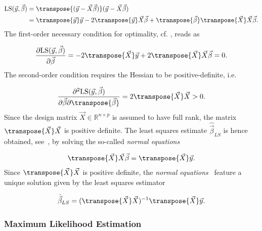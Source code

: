 \begin{align} \label{eq:LS_derivation}
		\begin{split}
				\text{LS}(\vec{y}, \vec{\beta})  &=\transpose{(\vec{y} - \vec{X} \vec{\beta})}(\vec{y} - \vec{X} \vec{\beta}) \\ 
								 				&=\transpose{\vec{y}}\vec{y} - 2\transpose{\vec{y}}\vec{X} \vec{\beta} + \transpose{\vec{\beta}}    \transpose{\vec{X}} \vec{X} \vec{\beta}.
		\end{split}
\end{align}
%
The first-order necessary condition for optimality, cf. \cite{luenberger1984linear}, reads as

\begin{align} \label{eq:LS_1st_derivative}
	\frac{\partial \text{LS}(\vec{y}, \vec{\beta})}{\partial \vec{\beta}} = -2\transpose{\vec{X}} \vec{y} + 2\transpose{\vec{X}} \vec{X} \vec{\beta} = 0.
\end{align}
%
The second-order condition requires the Hessian to be positive-definite, i.e. 

\begin{align} \label{eq:LS_2nd_derivative}
	\frac{\partial^2 \text{LS}(\vec{y}, \vec{\beta})}{\partial \vec{\beta} \partial \transpose{\vec{\beta}}} = 2\transpose{\vec{X}}\vec{X} > 0.
\end{align}
%
Since the design matrix $\vec{X} \in \mathbb{R}^{n \times p}$ is assumed to have full rank, the matrix $ \transpose{\vec{X}}\vec{X}$ is positive definite. The least squares estimate $\hat{\vec{\beta}}_{LS}$ is hence obtained, see~, by solving the so-called \emph{normal equations}

\begin{align} \label{eq:NormalEquations}
	\transpose{\vec{X}} \vec{X} \vec{\beta} = \transpose{\vec{X}} \vec{y}.
\end{align}
%
Since $\transpose{\vec{X}}\vec{X}$ is positive definite, the \emph{normal equations}~ feature a unique solution given by the least squares estimator

\begin{align} \label{eq:LS_estimator}
	\hat{\vec{\beta}}_{LS} = (\transpose{\vec{X}}\vec{X})^{-1} \transpose{\vec{X}}\vec{y}.
\end{align}

\subsubsection{Maximum Likelihood Estimation}

